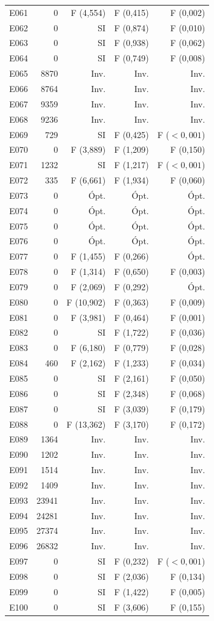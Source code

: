 \begin{longtable}{lrrrr}
E061 & 0 & F (4,554) & F (0,415) & F (0,002) \\
E062 & 0 & SI & F (0,874) & F (0,010) \\
E063 & 0 & SI & F (0,938) & F (0,062) \\
E064 & 0 & SI & F (0,749) & F (0,008) \\
E065 & 8870 & Inv. & Inv. & Inv. \\
E066 & 8764 & Inv. & Inv. & Inv. \\
E067 & 9359 & Inv. & Inv. & Inv. \\
E068 & 9236 & Inv. & Inv. & Inv. \\
E069 & 729 & SI & F (0,425) & F ($<0,001$) \\
E070 & 0 & F (3,889) & F (1,209) & F (0,150) \\
E071 & 1232 & SI & F (1,217) & F ($<0,001$) \\
E072 & 335 & F (6,661) & F (1,934) & F (0,060) \\
E073 & 0 & Ópt. & Ópt. & Ópt. \\
E074 & 0 & Ópt. & Ópt. & Ópt. \\
E075 & 0 & Ópt. & Ópt. & Ópt. \\
E076 & 0 & Ópt. & Ópt. & Ópt. \\
E077 & 0 & F (1,455) & F (0,266) & Ópt. \\
E078 & 0 & F (1,314) & F (0,650) & F (0,003) \\
E079 & 0 & F (2,069) & F (0,292) & Ópt. \\
E080 & 0 & F (10,902) & F (0,363) & F (0,009) \\
E081 & 0 & F (3,981) & F (0,464) & F (0,001) \\
E082 & 0 & SI & F (1,722) & F (0,036) \\
E083 & 0 & F (6,180) & F (0,779) & F (0,028) \\
E084 & 460 & F (2,162) & F (1,233) & F (0,034) \\
E085 & 0 & SI & F (2,161) & F (0,050) \\
E086 & 0 & SI & F (2,348) & F (0,068) \\
E087 & 0 & SI & F (3,039) & F (0,179) \\
E088 & 0 & F (13,362) & F (3,170) & F (0,172) \\
E089 & 1364 & Inv. & Inv. & Inv. \\
E090 & 1202 & Inv. & Inv. & Inv. \\
E091 & 1514 & Inv. & Inv. & Inv. \\
E092 & 1409 & Inv. & Inv. & Inv. \\
E093 & 23941 & Inv. & Inv. & Inv. \\
E094 & 24281 & Inv. & Inv. & Inv. \\
E095 & 27374 & Inv. & Inv. & Inv. \\
E096 & 26832 & Inv. & Inv. & Inv. \\
E097 & 0 & SI & F (0,232) & F ($<0,001$) \\
E098 & 0 & SI & F (2,036) & F (0,134) \\
E099 & 0 & SI & F (1,422) & F (0,005) \\
E100 & 0 & SI & F (3,606) & F (0,155) \\
\end{longtable}
